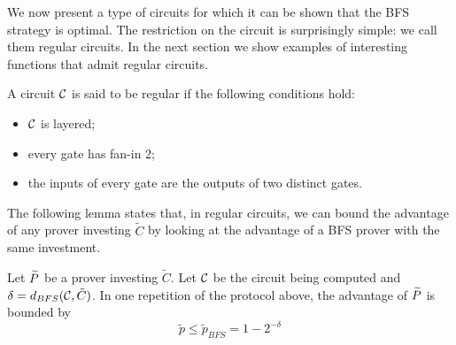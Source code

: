 We now present a type of circuits for which it can be shown that the BFS strategy is optimal. The restriction on the circuit is surprisingly simple: we call them 
{\sf regular circuits}. In 
the next section we show examples of interesting functions that admit regular circuits. 

\begin{definition}
\label{def:reg-circ}
	A circuit $\cal C$ is said to be regular if the following conditions hold:
	\begin{itemize}
		\item $\cal C$ is layered;
		\item every gate has fan-in 2;
		\item the inputs of every gate are the outputs of two distinct gates.
	\end{itemize}
\end{definition}

The following lemma states that, in regular circuits, we can bound the advantage of any prover investing $\tilde{C}$ by looking at the advantage of a BFS prover with the same investment.

\begin{lemma}
	\label{lemma:bfs-bound-reg}
	Let $\widetilde{P}$ be a prover investing $\tilde{C}$. Let $\cal C$ be the circuit being computed and $\delta=d_{BFS}({\cal C},\tilde{C})$. In one repetition of the  		protocol above, the advantage of $\widetilde{P}$ is bounded by 
	$$ \tilde{p} \leq \tilde{p}_{BFS} = 1 - 2^{-\delta}$$ 
\end{lemma}

